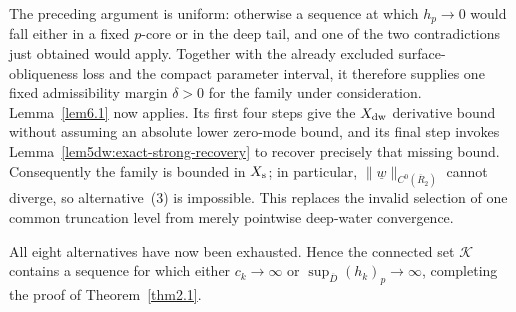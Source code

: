 \documentclass[11pt,reqno]{amsart}
\numberwithin{equation}{section}
\theoremstyle{definition}
\theoremstyle{remark}
\begin{document}
The preceding argument is uniform: otherwise a sequence at which
$h_p\to0$ would fall either in a fixed $p$-core or in the deep tail,
and one of the two contradictions just obtained would apply.
Together with the already excluded surface-obliqueness loss and the
compact parameter interval, it therefore supplies one fixed
admissibility margin $\delta>0$ for the family under consideration.
Lemma~\ref{lem6.1} now applies.  Its first four steps give the
$X_{\rm dw}$ derivative bound without assuming an absolute lower
zero-mode bound, and its final step invokes
Lemma~\ref{lem5dw:exact-strong-recovery} to recover precisely that
missing bound.  Consequently the family is bounded in $X_{\rm s}$;
in particular,
$\|\underline w\|_{C^0(\overline R_2)}$ cannot diverge, so
alternative~\textup{(3)} is impossible.  This replaces the invalid
selection of one common truncation level from merely pointwise
deep-water convergence.

All eight alternatives have now been exhausted.  Hence the connected
set $\mathcal K$ contains a sequence for which either $c_k\to\infty$
or $\sup_{\overline D}(h_k)_p\to\infty$, completing the proof of
Theorem~\ref{thm2.1}.



\makeatletter
\def\@biblabel#1{#1.~}
\makeatother

%

\providecommand{\bysame}{\leavevmode\hbox
to3em{\hrulefill}\thinspace}
\providecommand{\MR}{\relax\ifhmode\unskip\space\fi MR }
\providecommand{\MRhref}[2]{%
  \href{http://www.ams.org/mathscinet-getitem?mr=#1}{#2}
} \providecommand{\href}[2]{#2}
\end{document}

